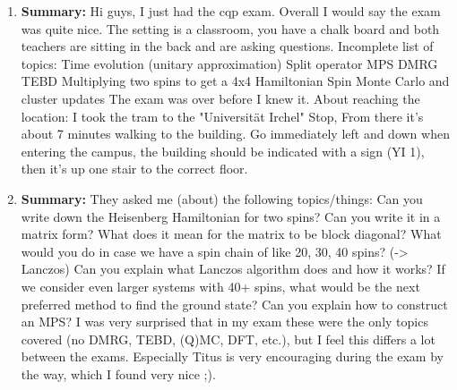 \documentclass{article}%
\begin{document}
\begin{enumerate}%
\item%
\begin{mycolorbox}%
\textbf{Summary:}%
\newline%
Hi guys, I just had the cqp exam.\newline%
Overall I would say the exam was quite nice. The setting is a classroom, you have a chalk board and both teachers are sitting in the back and are asking questions. Incomplete list of topics:\newline%
Time evolution (unitary approximation)\newline%
Split operator\newline%
MPS\newline%
DMRG\newline%
TEBD\newline%
Multiplying two spins to get a 4x4 Hamiltonian\newline%
Spin Monte Carlo and cluster updates\newline%
The exam was over before I knew it.\newline%
About reaching the location: I took the tram to the "Universität Irchel" Stop, From there it's about 7 minutes walking to the building. Go immediately left and down when entering the campus, the building should be indicated with a sign (YI 1), then it's up one stair to the correct floor.%
\end{mycolorbox}%
\item%
\textbf{Summary:}%
\newline%
They asked me (about) the following topics/things:\newline%
Can you write down the Heisenberg Hamiltonian for two spins?\newline%
Can you write it in a matrix form?\newline%
What does it mean for the matrix to be block diagonal?\newline%
What would you do in case we have a spin chain of like 20, 30, 40 spins? ({-}> Lanczos)\newline%
Can you explain what Lanczos algorithm does and how it works?\newline%
If we consider even larger systems with 40+ spins, what would be the next preferred method to find the ground state?\newline%
Can you explain how to construct an MPS?\newline%
I was very surprised that in my exam these were the only topics covered (no DMRG, TEBD, (Q)MC, DFT, etc.), but I feel this differs a lot between the exams.\newline%
Especially Titus is very encouraging during the exam by the way, which I found very nice ;).%
\end{enumerate}%
\newpage%
\end{document}

